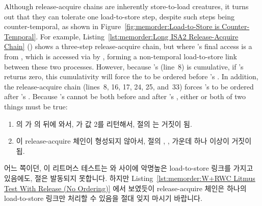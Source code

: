 Although release-acquire chains are inherently store-to-load creatures,
it turns out that they can tolerate one load-to-store step, despite
such steps being counter-temporal, as shown in
Figure~\ref{fig:memorder:Load-to-Store is Counter-Temporal}.
For example,
Listing~\ref{lst:memorder:Long ISA2 Release-Acquire Chain}
()
shows a three-step release-acquire chain, but where 's
final access is a  from , which is
accessed via  by , forming a non-temporal
load-to-store link between these two processes.
However, because 's  (line~8)
is cumulative, if 's  returns zero,
this cumulativity will force the  to be ordered
before 's .
In addition, the release-acquire chain (lines~8, 16, 17, 24, 25, and~33)
forces 's  to be ordered after 's
.
Because 's  cannot be both before and after
's , either or both of two things must
be true:
\fi

\begin{enumerate}
\item	{} 의  가  의  뒤에
	와서,  가 값 2를 리턴해서,  절의 
	는 거짓이 됨.
\item	이 release-acquire 체인이 형성되지 않아서,  절의
	, ,  가운데 하나 이상이 거짓이 됩.

\end{enumerate}

어느 쪽이던, 이 리트머스 테스트는  와  사이에 악명높은
load-to-store 링크를 가지고 있음에도,  절은 발동되지 못합니다.
하지만
Listing~\ref{lst:memorder:W+RWC Litmus Test With Release (No Ordering)}
에서 보였듯이 release-acquire 체인은 하나의 load-to-store 링크만 처리할 수
있음을 절대 잊지 마시기 바랍니다.

